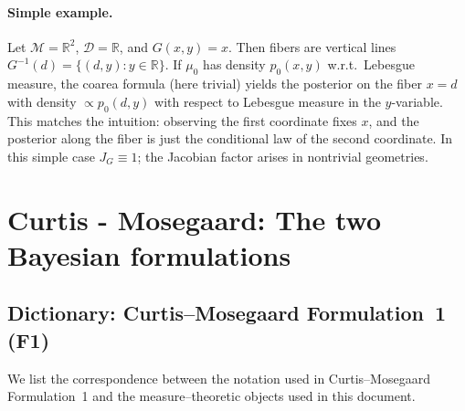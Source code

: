 \documentclass[11pt]{article}
\theoremstyle{remark}
\newcommand{\modelspace}{\mathcal{M}}
\newcommand{\dataspace}{\mathcal{D}}
\begin{document}
\paragraph{Simple example.}
Let \(\modelspace=\mathbb{R}^2\), \(\dataspace=\mathbb{R}\), and \(G(x,y)=x\).
Then fibers are vertical lines \(G^{-1}(d)=\{(d,y):y\in\mathbb{R}\}\).
If \(\mu_0\) has density \(p_0(x,y)\) w.r.t.\ Lebesgue measure, the coarea
formula (here trivial) yields the posterior on the fiber \(x=d\) with density
\(\propto p_0(d,y)\) with respect to Lebesgue measure in the \(y\)-variable.
This matches the intuition: observing the first coordinate fixes \(x\), and the
posterior along the fiber is just the conditional law of the second coordinate.
In this simple case \(J_G\equiv 1\); the Jacobian factor arises in nontrivial
geometries.

\section{Curtis - Mosegaard: The two Bayesian formulations}

\subsection*{Dictionary: Curtis--Mosegaard Formulation~1 (F1)}

We list the correspondence between the notation used in Curtis--Mosegaard
Formulation~1 and the measure--theoretic objects used in this document.
\end{document}
